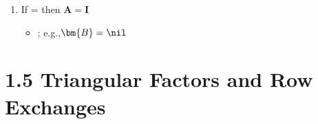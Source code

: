\begin{itemize}
{\begin{enumerate}
\begin{enumerate}
          \item If  =  then \( \bm{A} = \bm{I} \)
            \begin{itemize}\color{foreground}
              \item {}; e.g.,\( \bm{B} = \nil \)
            \end{itemize}

        \end{enumerate}
    \end{enumerate}}

\end{itemize}

\section{1.5 Triangular Factors and Row Exchanges}
